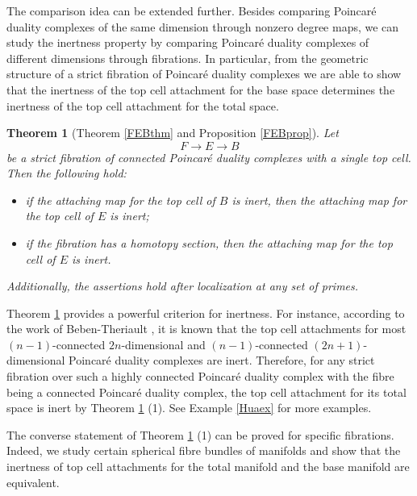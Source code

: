 \documentclass[a4]{amsart}
\newtheorem{theorem}{Theorem}[section]
\theoremstyle{definition}
\begin{document}
\begin{sloppypar}
The comparison idea can be extended further. Besides comparing Poincar\'{e} duality complexes of the same dimension through nonzero degree maps, we can study the inertness property by comparing Poincar\'{e} duality complexes of different dimensions through fibrations. In particular, from the geometric structure of a strict fibration of  Poincar\'{e} duality complexes we are able to show that the inertness of the top cell attachment for the base space determines the inertness of the top cell attachment for the total space. 
\begin{theorem}[Theorem \ref{FEBthm} and Proposition \ref{FEBprop}]\label{FEBthmintro}
Let 
\[\label{FEBeqintro}
F\stackrel{}{\longrightarrow} E\stackrel{}{\longrightarrow} B
\]
 be a strict fibration of connected Poincar\'{e} duality complexes with a single top cell. Then the following hold:
\begin{itemize}
\item[(1).] if the attaching map for the top cell of $B$ is inert, then the attaching map for the top cell of $E$ is inert;
\item[(2).] if the fibration has a homotopy section, then the attaching map for the top cell of $E$ is inert.
\end{itemize}
Additionally, the assertions hold after localization at any set of primes.
\end{theorem}

Theorem \ref{FEBthmintro} provides a powerful criterion for inertness. For instance, according to the work of Beben-Theriault \cite{BT14}, it is known that the top cell attachments for most $(n-1)$-connected $2n$-dimensional and $(n-1)$-connected $(2n+1)$-dimensional Poincar\'{e} duality complexes are inert. 
Therefore, for any strict fibration over such a highly connected Poincar\'{e} duality complex with the fibre being a connected Poincar\'{e} duality complex, the top cell attachment for its total space is inert by Theorem \ref{FEBthmintro} (1). See Example \ref{Huaex} for more examples. 

The converse statement of Theorem \ref{FEBthmintro} (1) can be proved for specific fibrations. 
Indeed, we study certain spherical fibre bundles of manifolds and show that the inertness of top cell attachments for the total manifold and the base manifold are equivalent. 


\end{sloppypar}
\end{document}
